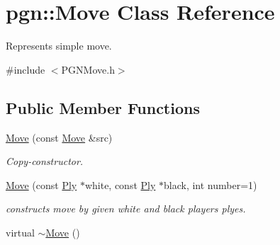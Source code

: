 \hypertarget{classpgn_1_1Move}{
\section{pgn::Move Class Reference}
\label{classpgn_1_1Move}
}


Represents simple move.  




{\ttfamily \#include $<$PGNMove.h$>$}

\subsection*{Public Member Functions}
\begin{DoxyCompactItemize}
\item 
\hyperlink{classpgn_1_1Move_a28247b92783975d25036b9d5194114b4}{Move} (const \hyperlink{classpgn_1_1Move}{Move} \&src)
\begin{DoxyCompactList}\small\item\em Copy-\/constructor. \item\end{DoxyCompactList}\item 
\hyperlink{classpgn_1_1Move_ab33e0b091e41d8539bbec7a69ce06ec5}{Move} (const \hyperlink{classpgn_1_1Ply}{Ply} $\ast$white, const \hyperlink{classpgn_1_1Ply}{Ply} $\ast$black, int number=1)
\begin{DoxyCompactList}\small\item\em constructs move by given white and black players plyes. \item\end{DoxyCompactList}\item 
\hypertarget{classpgn_1_1Move_ad6c3be4f553b0757a896a44776634bd9}{
virtual \hyperlink{classpgn_1_1Move_ad6c3be4f553b0757a896a44776634bd9}{$\sim$Move} ()}
\label{classpgn_1_1Move_ad6c3be4f553b0757a896a44776634bd9}


\end{DoxyCompactItemize}
